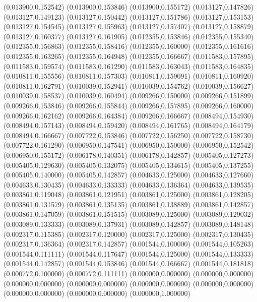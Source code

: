 (0.013900,0.152542)
(0.013900,0.153846)
(0.013900,0.155172)
(0.013127,0.147826)
(0.013127,0.149123)
(0.013127,0.150442)
(0.013127,0.151786)
(0.013127,0.153153)
(0.013127,0.154545)
(0.013127,0.155963)
(0.013127,0.157407)
(0.013127,0.158879)
(0.013127,0.160377)
(0.013127,0.161905)
(0.012355,0.153846)
(0.012355,0.155340)
(0.012355,0.156863)
(0.012355,0.158416)
(0.012355,0.160000)
(0.012355,0.161616)
(0.012355,0.163265)
(0.012355,0.164948)
(0.012355,0.166667)
(0.011583,0.157895)
(0.011583,0.159574)
(0.011583,0.161290)
(0.011583,0.163043)
(0.011583,0.164835)
(0.010811,0.155556)
(0.010811,0.157303)
(0.010811,0.159091)
(0.010811,0.160920)
(0.010811,0.162791)
(0.010039,0.152941)
(0.010039,0.154762)
(0.010039,0.156627)
(0.010039,0.158537)
(0.010039,0.160494)
(0.009266,0.150000)
(0.009266,0.151899)
(0.009266,0.153846)
(0.009266,0.155844)
(0.009266,0.157895)
(0.009266,0.160000)
(0.009266,0.162162)
(0.009266,0.164384)
(0.009266,0.166667)
(0.008494,0.154930)
(0.008494,0.157143)
(0.008494,0.159420)
(0.008494,0.161765)
(0.008494,0.164179)
(0.008494,0.166667)
(0.007722,0.153846)
(0.007722,0.156250)
(0.007722,0.158730)
(0.007722,0.161290)
(0.006950,0.147541)
(0.006950,0.150000)
(0.006950,0.152542)
(0.006950,0.155172)
(0.006178,0.140351)
(0.006178,0.142857)
(0.005405,0.127273)
(0.005405,0.129630)
(0.005405,0.132075)
(0.005405,0.134615)
(0.005405,0.137255)
(0.005405,0.140000)
(0.005405,0.142857)
(0.004633,0.125000)
(0.004633,0.127660)
(0.004633,0.130435)
(0.004633,0.133333)
(0.004633,0.136364)
(0.004633,0.139535)
(0.003861,0.119048)
(0.003861,0.121951)
(0.003861,0.125000)
(0.003861,0.128205)
(0.003861,0.131579)
(0.003861,0.135135)
(0.003861,0.138889)
(0.003861,0.142857)
(0.003861,0.147059)
(0.003861,0.151515)
(0.003089,0.125000)
(0.003089,0.129032)
(0.003089,0.133333)
(0.003089,0.137931)
(0.003089,0.142857)
(0.003089,0.148148)
(0.002317,0.115385)
(0.002317,0.120000)
(0.002317,0.125000)
(0.002317,0.130435)
(0.002317,0.136364)
(0.002317,0.142857)
(0.001544,0.100000)
(0.001544,0.105263)
(0.001544,0.111111)
(0.001544,0.117647)
(0.001544,0.125000)
(0.001544,0.133333)
(0.001544,0.142857)
(0.001544,0.153846)
(0.001544,0.166667)
(0.001544,0.181818)
(0.000772,0.100000)
(0.000772,0.111111)
(0.000000,0.000000)
(0.000000,0.000000)
(0.000000,0.000000)
(0.000000,0.000000)
(0.000000,0.000000)
(0.000000,0.000000)
(0.000000,0.000000)
(0.000000,0.000000)
(0.000000,1.000000)